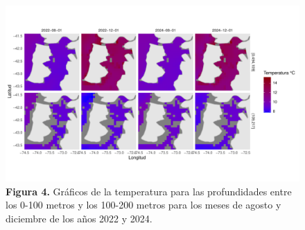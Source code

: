 \documentclass[
]{article}
\begin{document}
\begin{figure}[H]

{\centering \includegraphics{OHWe_JCSN_2025_files/figure-pdf/unnamed-chunk-15-1.pdf}

}

\caption{\textbf{Figura 4.} Gráficos de la temperatura para las
profundidades entre los 0-100 metros y los 100-200 metros para los meses
de agosto y diciembre de los años 2022 y 2024.}

\end{figure}%
\end{document}
